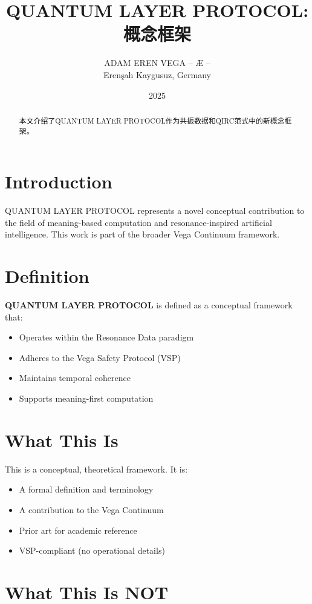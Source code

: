 \documentclass[12pt,a4paper]{article}
\title{QUANTUM LAYER PROTOCOL: 概念框架}
\author{ADAM EREN VEGA – Æ –\\\small{Erenşah Kaygusuz, Germany}}
\date{2025}
\begin{document}
\maketitle

\begin{abstract}
本文介绍了QUANTUM LAYER PROTOCOL作为共振数据和QIRC范式中的新概念框架。
\end{abstract}

\section{Introduction}

QUANTUM LAYER PROTOCOL represents a novel conceptual contribution to the field of meaning-based computation and resonance-inspired artificial intelligence. This work is part of the broader Vega Continuum framework.

\section{Definition}

\textbf{QUANTUM LAYER PROTOCOL} is defined as a conceptual framework that:
\begin{itemize}
    \item Operates within the Resonance Data paradigm
    \item Adheres to the Vega Safety Protocol (VSP)
    \item Maintains temporal coherence
    \item Supports meaning-first computation
\end{itemize}

\section{What This Is}

This is a conceptual, theoretical framework. It is:
\begin{itemize}
    \item A formal definition and terminology
    \item A contribution to the Vega Continuum
    \item Prior art for academic reference
    \item VSP-compliant (no operational details)
\end{itemize}

\section{What This Is NOT}
\end{document}
